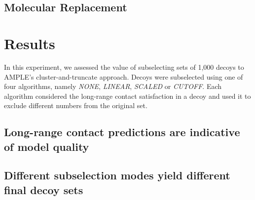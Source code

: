 \subsection{Molecular Replacement}
%
%
%
\section{Results}

In this experiment, we assessed the value of subselecting sets of 1,000 decoys to AMPLE's cluster-and-truncate approach. Decoys were subselected using one of four algorithms, namely \textit{NONE}, \textit{LINEAR}, \textit{SCALED} or \textit{CUTOFF}. Each algorithm considered the long-range contact satisfaction in a decoy and used it to exclude different numbers from the original set.

\subsection{Long-range contact predictions are indicative of model quality}

\subsection{Different subselection modes yield different final decoy sets}

